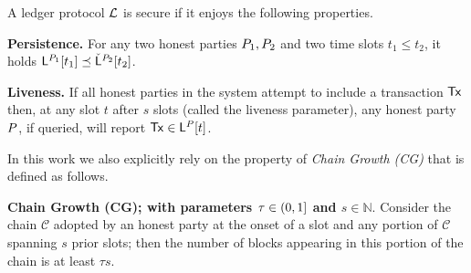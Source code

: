 \begin{definition}\label{de:ledger} A ledger protocol $\mathcal{L}$ is secure if it enjoys the following properties.



\begin{myitemize}
  \item[]{\bf Persistence.}
    For any two honest parties $P_1,P_2$ and two time slots $t_1\leq t_2$,
    it holds  $\mathsf{L}^{P_1}[t_1] \preceq
    \check{\mathsf{L}}^{P_2}[t_2]$.

  \item[]{\bf Liveness.}
    If all honest parties in the system attempt to include a  transaction $\mathsf{Tx}$
    then, at any slot $t$ after $s$ slots (called the
    liveness parameter), any honest party $P$, if queried,
    will report $\mathsf{Tx} \in \mathsf{L}^{P}[t]$.
\end{myitemize}

\end{definition}

In this work we also explicitly rely on the property of \emph{Chain Growth (CG)} that is defined as follows.

\begin{myitemize}
  \item[] {\bf Chain Growth (CG); with parameters $\tau\in (0,1]$ and $s\in\mathbb{N}$}. Consider the chain $\mathcal{C}$
  adopted by an honest party at the onset of a slot and any portion of $\mathcal{C}$ spanning $s$ prior slots; then the number of
  blocks appearing in this portion of the chain is at least $\tau s$.
 \end{myitemize}




